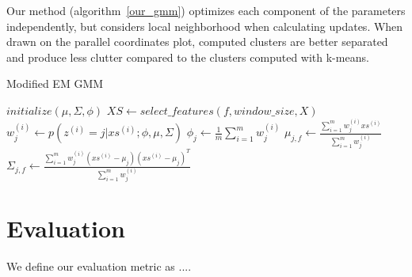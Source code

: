\documentclass[10pt,a4paper]{article}
\begin{document}
Our method (algorithm~\ref{our_gmm}) optimizes each component of the parameters independently, but considers local neighborhood when calculating updates. When drawn on the parallel coordinates plot, computed clusters are better separated and produce less clutter compared to the clusters computed with k-means.
\begin{algorithm}
\caption{Modified EM GMM}
\label{our_gmm}
\begin{algorithmic}
\State $initialize(\mu, \Sigma, \phi)$
        \State $XS\gets select\_features(f, window\_size, X)$
            \State $w_j^{(i)}\gets p(z^{(i)} = j|xs^{(i)}; \phi, \mu, \Sigma)$
        \EndFor
        \State
        \State $\phi_{j}\gets\frac{1}{m}\sum_{i=1}^{m}w_j^{(i)}$
        \State $\mu_{j,f}\gets\frac{\sum_{i=1}^mw_j^{(i)}xs^{(i)}}{\sum_{i=1}^mw_j^{(i)}}$
        \State $\Sigma_{j,f}\gets\frac{\sum_{i=1}^mw_j^{(i)}(xs^{(i)}-\mu_j)(xs^{(i)}-\mu_j)^T}{\sum_{i=1}^mw_j^{(i)}}$
    \EndFor
\EndFor
\EndFunction
\end{algorithmic}
\end{algorithm}

\section{Evaluation}
We define our evaluation metric as  ....
\end{document}
